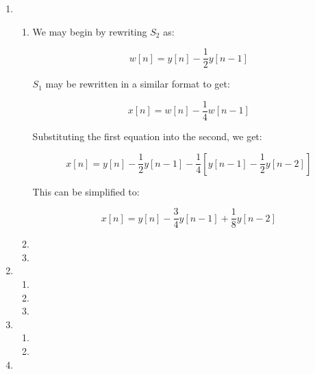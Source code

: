 \begin{enumerate}

  \item

    \begin{enumerate}

      \item 

        We may begin by rewriting $S_2$ as:

        $$w[n]=y[n]-\frac{1}{2}y[n-1]$$

        $S_1$ may be rewritten in a similar format to get:

        $$x[n]=w[n]-\frac{1}{4}w[n-1]$$

        Substituting the first equation into the second, we get:

        $$x[n]=y[n]-\frac{1}{2}y[n-1]-\frac{1}{4}\left[ y[n-1]-\frac{1}{2}y[n-2] \right]$$

        This can be simplified to:

        $$\boxed{x[n]=y[n]-\frac{3}{4}y[n-1]+\frac{1}{8}y[n-2]}$$

      \item 

      \item 

    \end{enumerate}

  \item

    \begin{enumerate}

      \item 

      \item 

      \item 

    \end{enumerate}

  \item

    \begin{enumerate}

      \item 

      \item 

    \end{enumerate}

  \item

    \begin{enumerate}


\end{enumerate}
\end{enumerate}
